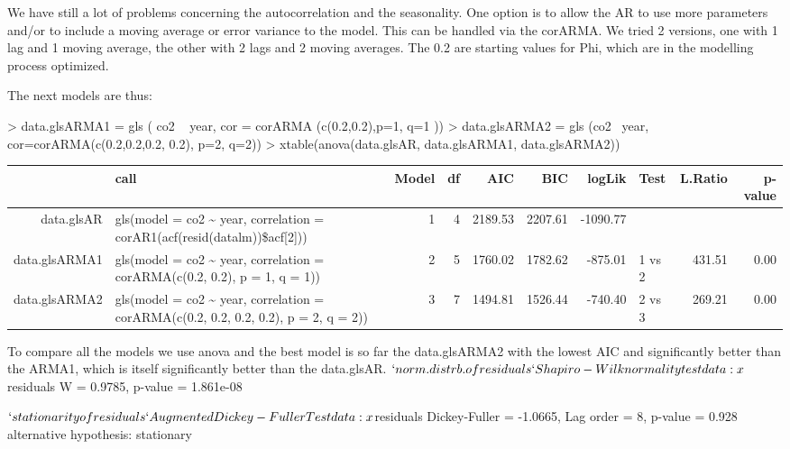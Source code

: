 \documentclass[11pt, a4paper]{article} %
\begin{document}
We have still a lot of problems concerning the autocorrelation and the seasonality. One option is to allow the AR to use more parameters and/or to include a moving average or error variance to the model. This can be handled via the corARMA. We tried 2 versions, one with 1 lag and 1 moving average, the other with 2 lags and 2 moving averages. 
The 0.2 are starting values for Phi, which are in the modelling process optimized. 

The next models are thus: 
\begin{Schunk}
\begin{Sinput}
> data.glsARMA1 = gls ( co2 ~ year, cor = corARMA (c(0.2,0.2),p=1, q=1 )) 
> data.glsARMA2 = gls (co2 ~year, cor=corARMA(c(0.2,0.2,0.2, 0.2), p=2, q=2)) 
> xtable(anova(data.glsAR, data.glsARMA1, data.glsARMA2))
\end{Sinput}
\begin{table}[ht]
\centering
\begin{tabular}{rlrrrrrlrr}
  \hline
 & call & Model & df & AIC & BIC & logLik & Test & L.Ratio & p-value \\ 
  \hline
data.glsAR & gls(model = co2 \~{} year, correlation = corAR1(acf(resid(datalm))\$acf[2])) &   1 &   4 & 2189.53 & 2207.61 & -1090.77 &  &  &  \\ 
  data.glsARMA1 & gls(model = co2 \~{} year, correlation = corARMA(c(0.2, 0.2), p = 1,     q = 1)) &   2 &   5 & 1760.02 & 1782.62 & -875.01 & 1 vs 2 & 431.51 & 0.00 \\ 
  data.glsARMA2 & gls(model = co2 \~{} year, correlation = corARMA(c(0.2, 0.2, 0.2,     0.2), p = 2, q = 2)) &   3 &   7 & 1494.81 & 1526.44 & -740.40 & 2 vs 3 & 269.21 & 0.00 \\ 
   \hline
\end{tabular}
\end{table}\end{Schunk}
To compare all the models we use anova and the best model is  so far the data.glsARMA2 with the lowest AIC and significantly better than the ARMA1, which is itself significantly better than the data.glsAR. 
$`norm. distrb. of residuals`

	Shapiro-Wilk normality test

data:  x$residuals
W = 0.9785, p-value = 1.861e-08


$`stationarity of residuals`

	Augmented Dickey-Fuller Test

data:  x$residuals
Dickey-Fuller = -1.0665, Lag order = 8, p-value = 0.928
alternative hypothesis: stationary
\end{document}
